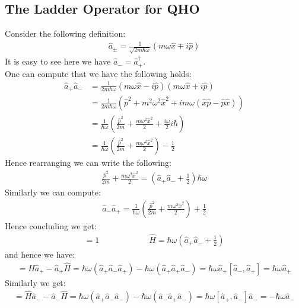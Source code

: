 \documentclass[11pt]{book}
\theoremstyle{break}
\theoremstyle{break}
\begin{document}
\subsection{The Ladder Operator for QHO}
Consider the following definition:
\begin{align*}
\hat{a}_{\pm} = \frac{1}{\sqrt{2m\hbar \omega}}\left(m\omega \hat{x} \mp i\hat{p}\right)
\end{align*}
It is easy to see here we have $\hat{a}_- = \hat{a}_+^\dagger$. \\
One can compute that we have the following holds:
\begin{align*}
\hat{a}_+ \hat{a}_- &= \frac{1}{2m \hbar \omega}(m\omega \hat{x} - i\hat{p})(m\omega \hat{x}+i\hat{p})\\
&= \frac{1}{2m\hbar	\omega}\left(\hat{p}^2 +m^2\omega^2 \hat{x}^2 + im\omega\left(\hat{x}\hat{p}-\hat{p}\hat{x}\right)\right)
\\
&= \frac{1}{\hbar \omega}\left( \frac{\hat{p}^2}{2m}+\frac{m\omega^2 \hat{x}^2}{2}+\frac{i\omega}{2}i\hbar\right)\\
&= \frac{1}{\hbar\omega}\left( \frac{\hat{p}^2}{2m} + \frac{m\omega^2 \hat{x}^2}{2} \right)- \frac{1}{2}
\end{align*}
Hence rearranging we can write the following:
\begin{align*}
\frac{\hat{p}^2}{2m}+\frac{m\omega^2 \hat{x}^2 }{2}= \left(\hat{a}_+\hat{a}_- +\frac{1}{2}\right) \hbar	\omega
\end{align*}
Similarly we can compute:
\begin{align*}
\hat{a}_- \hat{a}_+ = \frac{1}{\hbar\omega}\left( \frac{\hat{p}^2}{2m} + \frac{m\omega^2 \hat{x}^2}{2} \right)+ \frac{1}{2}
\end{align*}
Hence concluding we get:
\begin{align*}
[\hat{a}_- , \hat{a}_+] = 1 \qquad\qquad\qquad \hat{H}=\hbar\omega\left( \hat{a}_+\hat{a}_- +\frac{1}{2}\right)
\end{align*}
and hence we have:
\begin{align*}
[\hat{H},\hat{a}_+] = \hat{H}\hat{a}_+ - \hat{a}_+\hat{H}= \hbar \omega\left(\hat{a}_+\hat{a}_- \hat{a}_+ \right) - \hbar \omega\left(\hat{a}_+  \hat{a}_+\hat{a}_- \right) =\hbar \omega \hat{a}_+ [\hat{a}_-, \hat{a}_+] = \hbar \omega \hat{a}_+ 
\end{align*}
Similarly we get:
\begin{align*}
 [\hat{H},\hat{a}_-] = \hat{H}\hat{a}_- - \hat{a}_-\hat{H}= \hbar \omega\left(\hat{a}_+\hat{a}_- \hat{a}_- \right) - \hbar \omega\left(\hat{a}_-  \hat{a}_+\hat{a}_- \right) =\hbar \omega [\hat{a}_+, \hat{a}_-]\hat{a}_- = -\hbar \omega \hat{a}_-
\end{align*}
\end{document}

